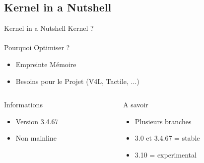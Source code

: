 \documentclass[11pt]{beamer}
\begin{document}
	
	\subsection{Kernel in a Nutshell}
	\begin{frame}[label=Kernel]{Kernel in a Nutshell}
	Kernel ? \\ \hyperlink{Linux}{}\\
	\pause
	Pourquoi Optimiser ?
	\pause
	 \begin{itemize}
	  \item Empreinte Mémoire
	  \pause
	  \item Besoins pour le Projet (V4L, Tactile, ...)
	 \end{itemize}
	  \pause
	  	\begin{columns}[t]
		\begin{column}{5cm}
		\begin{block}{Informations}
		\begin{itemize}
			\item Version 3.4.67
			\item Non mainline \\
			\href{https://github.com/linux-sunxi/linux-sunxi}{}
		\end{itemize}
		\end{block}
		\end{column}
		
		\begin{column}{5cm}
		\begin{block}{A savoir} 
		  \begin{itemize}
		    \item Plusieurs branches
		    \item 3.0 et 3.4.67 = stable
		    \item 3.10 = experimental
	\end{itemize}
	\end{block}
	\end{column}
	\end{columns}
	\end{frame}
\end{document}
